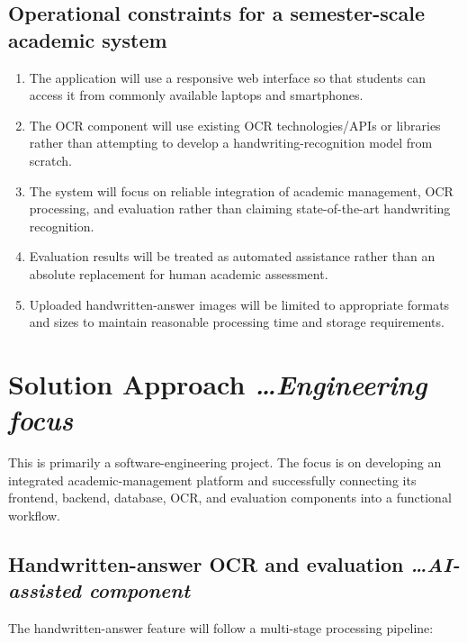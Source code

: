 \documentclass[11pt,a4paper]{article}
\newcommand{\BvrHint}[1]{%
  {\normalfont\normalsize\itshape\hfill #1}}
\begin{document}
\subsection{Operational constraints for a semester-scale academic system}
\begin{enumerate}
    \item The application will use a responsive web interface so that students can access it from commonly available laptops and smartphones.

    \item The OCR component will use existing OCR technologies/APIs or libraries rather than attempting to develop a handwriting-recognition model from scratch.

    \item The system will focus on reliable integration of academic management, OCR processing, and evaluation rather than claiming state-of-the-art handwriting recognition.

    \item Evaluation results will be treated as automated assistance rather than an absolute replacement for human academic assessment.

    \item Uploaded handwritten-answer images will be limited to appropriate formats and sizes to maintain reasonable processing time and storage requirements.
\end{enumerate}

\section{Solution Approach %
\BvrHint{\ldots Engineering focus}}
This is primarily a software-engineering project. The focus is on developing an integrated academic-management platform and successfully connecting its frontend, backend, database, OCR, and evaluation components into a functional workflow.

\subsection{Handwritten-answer OCR and evaluation %
\BvrHint{\ldots AI-assisted component}}
The handwritten-answer feature will follow a multi-stage processing pipeline:
\end{document}
